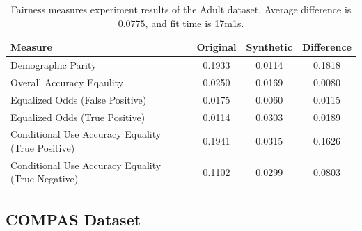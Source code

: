 \documentclass[manuscript,screen,review,anonymous]{acmart}
\begin{document}
\begin{table}[h]
\caption{
    Fairness measures experiment results of the Adult dataset.
    Average difference is $0.0775$, and fit time is 17m1s.
}

\label{tab:adult_score}
\begin{tabular}{lccc}
\toprule
\textbf{Measure} & \textbf{Original} & \textbf{Synthetic} & \textbf{Difference} \\
\midrule
Demographic Parity  & 0.1933 & 0.0114 & 0.1818 \\
Overall Accuracy Eqaulity   & 0.0250 & 0.0169 & 0.0080 \\
Equalized Odds (False Positive)    & 0.0175 & 0.0060 & 0.0115 \\
Equalized Odds (True Positive)    & 0.0114 & 0.0303 & 0.0189 \\
Conditional Use Accuracy Equality (True Positive) & 0.1941 & 0.0315 & 0.1626 \\
Conditional Use Accuracy Equality (True Negative) & 0.1102 & 0.0299 & 0.0803 \\
\bottomrule
\end{tabular}
\end{table}

\subsection{COMPAS Dataset}
\end{document}
